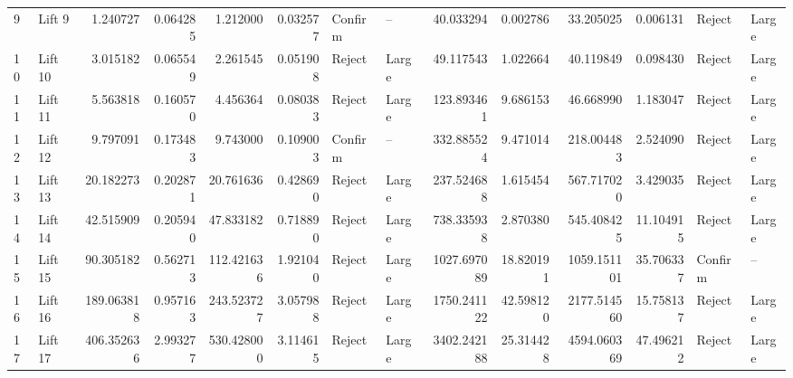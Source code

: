 \begin{tabular}{llrrrrllrrrrll}
9  &   Lift 9 &           1.240727 &  0.064285 &            1.212000 &  0.032577 &  Confirm &          -- &                40.033294 &   0.002786 &                 33.205025 &   0.006131 &   Reject &       Large \\
10 &  Lift 10 &           3.015182 &  0.065549 &            2.261545 &  0.051908 &   Reject &       Large &                49.117543 &   1.022664 &                 40.119849 &   0.098430 &   Reject &       Large \\
11 &  Lift 11 &           5.563818 &  0.160570 &            4.456364 &  0.080383 &   Reject &       Large &               123.893461 &   9.686153 &                 46.668990 &   1.183047 &   Reject &       Large \\
12 &  Lift 12 &           9.797091 &  0.173483 &            9.743000 &  0.109003 &  Confirm &          -- &               332.885524 &   9.471014 &                218.004483 &   2.524090 &   Reject &       Large \\
13 &  Lift 13 &          20.182273 &  0.202871 &           20.761636 &  0.428690 &   Reject &       Large &               237.524688 &   1.615454 &                567.717020 &   3.429035 &   Reject &       Large \\
14 &  Lift 14 &          42.515909 &  0.205940 &           47.833182 &  0.718890 &   Reject &       Large &               738.335938 &   2.870380 &                545.408425 &  11.104915 &   Reject &       Large \\
15 &  Lift 15 &          90.305182 &  0.562713 &          112.421636 &  1.921040 &   Reject &       Large &              1027.697089 &  18.820191 &               1059.151101 &  35.706337 &  Confirm &          -- \\
16 &  Lift 16 &         189.063818 &  0.957163 &          243.523727 &  3.057988 &   Reject &       Large &              1750.241122 &  42.598120 &               2177.514560 &  15.758137 &   Reject &       Large \\
17 &  Lift 17 &         406.352636 &  2.993277 &          530.428000 &  3.114615 &   Reject &       Large &              3402.242188 &  25.314428 &               4594.060369 &  47.496212 &   Reject &       Large \\
\bottomrule
\end{tabular}
